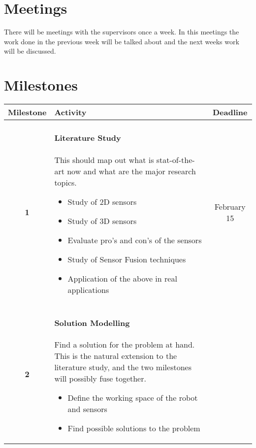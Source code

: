\documentclass[a4paper, 10pt]{article}
\begin{document}
\section{Meetings}
There will be meetings with the supervisors once a week. In this meetings the work done in
the previous week will be talked about and the next weeks work will be discussed.  


\section{Milestones}
\begin{tabular}{| c | p{11.5cm} || c |}
    \hline
        Milestone   &   Activity    &   Deadline \\
    \hline
    \hline
        \textbf{1}  &   \paragraph{Literature Study} This should map out what is
                        stat-of-the-art now and what are the major research topics.
                        \begin{itemize}
                            \item Study of 2D sensors 
                            \item Study of 3D sensors
                            \item Evaluate pro's and con's of the sensors
                            \item Study of Sensor Fusion techniques
                            \item Application of the above in real applications
                        \end{itemize}
                                                       & February 15 \\
        \hline
        \textbf{2}  &   \paragraph{Solution Modelling} Find a solution for the problem
                        at hand. This is the natural extension to the literature study,
                        and the two milestones will possibly fuse together. 
                        \begin{itemize}
                            \item Define the working space of the robot and sensors 
                            \item Find possible solutions to the problem 

\end{itemize}
\end{tabular}
\end{document}
